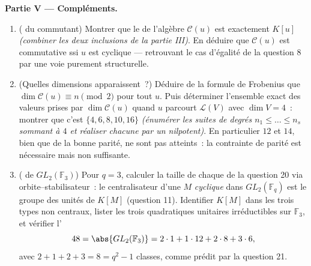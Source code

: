 \begin{problem}
\medskip
\noindent\textbf{Partie V --- Compléments.}
\begin{enumerate}[resume]
  \item ( du commutant) Montrer que le  de
        l'algèbre $\mathcal C(u)$ est exactement $K[u]$
        \emph{(combiner les deux inclusions de la partie
        III)}. En déduire que $\mathcal C(u)$ est commutative
        ssi $u$ est cyclique --- retrouvant le cas d'égalité de
        la question 8 par une voie purement structurelle.
  \item (Quelles dimensions apparaissent~?) Déduire de la
        formule de Frobenius que $\dim\mathcal C(u) \equiv n
        \pmod 2$ pour tout $u$. Puis déterminer l'ensemble exact
        des valeurs prises par $\dim \mathcal C(u)$ quand $u$
        parcourt $\mathcal L(V)$ avec $\dim V = 4$~: montrer
        que c'est $\{4, 6, 8, 10, 16\}$ \emph{(énumérer les
        suites de degrés $n_1 \leq \dots \leq n_s$ sommant à
        $4$ et réaliser chacune par un nilpotent)}. En
        particulier $12$ et $14$, bien que de la bonne parité,
        ne sont pas atteints~: la contrainte de parité est
        nécessaire mais non suffisante.
  \item ( de $GL_2(\mathbb F_3)$) Pour $q =
        3$, calculer la taille de chaque 
        de la question 20 via orbite--stabilisateur~: le
        centralisateur d'une $M$ \emph{cyclique} dans
        $GL_2(\mathbb F_q)$ est le groupe des unités de $K[M]$
        (question 11). Identifier $K[M]$ dans les trois types
        non centraux, lister les trois quadratiques unitaires
        irréductibles sur $\mathbb F_3$, et vérifier
        l'
        \[
        48 = \abs{GL_2(\mathbb F_3)}
        = 2\cdot1 + 1\cdot12 + 2\cdot8 + 3\cdot6,
        \]
        avec $2 + 1 + 2 + 3 = 8 = q^2 - 1$ classes, comme prédit
        par la question 21.
\end{enumerate}
\end{problem}
